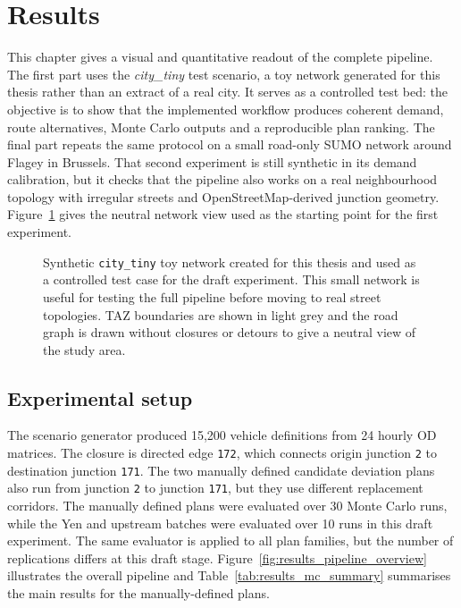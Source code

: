 \section{Results}

This chapter gives a visual and quantitative readout of the complete
pipeline. The first part uses the \emph{city\_tiny} test scenario, a toy
network generated for this thesis rather than an extract of a real city. It
serves as a controlled test bed: the objective is to show that the implemented
workflow produces coherent demand, route alternatives, Monte Carlo outputs and
a reproducible plan ranking. The final part repeats the same protocol on a
small road-only SUMO network around Flagey in Brussels. That second experiment
is still synthetic in its demand calibration, but it checks that the pipeline
also works on a real neighbourhood topology with irregular streets and
OpenStreetMap-derived junction geometry.
Figure~\ref{fig:results_city_tiny_network} gives the neutral network view used
as the starting point for the first experiment.

\begin{figure}[H]
  \centering
\caption{Synthetic \texttt{city\_tiny} toy network created for this thesis and
used as a controlled test case for the draft experiment. This small network is
useful for testing the full pipeline before moving to real street topologies.
TAZ boundaries are shown in light grey and the road graph is drawn without
closures or detours to give a neutral view of the study area.}
  \label{fig:results_city_tiny_network}
\end{figure}

\subsection{Experimental setup}
The scenario generator produced 15,200 vehicle definitions from 24
hourly OD matrices. The closure is directed edge \texttt{172}, which connects
origin junction \texttt{2} to destination junction \texttt{171}. The two
manually defined candidate deviation plans also run from junction
\texttt{2} to junction \texttt{171}, but they use different replacement
corridors. The manually defined plans were evaluated over 30 Monte Carlo runs, while the
Yen and upstream batches were evaluated over 10 runs in this draft experiment.
The same evaluator is applied to all plan families, but the number of
replications differs at this draft stage.
Figure~\ref{fig:results_pipeline_overview} illustrates the overall pipeline and
Table~\ref{tab:results_mc_summary} summarises the main results for the
manually-defined plans.

